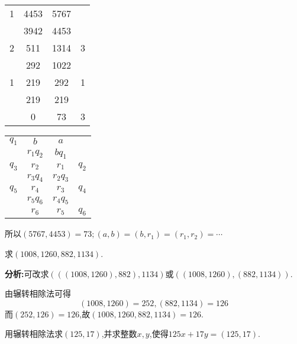 \begin{minipage}{\textwidth}
	\begin{minipage}[t]{0.45\textwidth}
		\centering
		\begin{tabular}{c|cc|c}
			1 & 4453 & 5767 &   \\
			  & 3942 & 4453 &   \\ \cline{2-3}
			2 &  511 & 1314 & 3 \\
			  &  292 & 1022 &   \\ \cline{2-3}
			1 &  219 &  292 & 1 \\
			  &  219 &  219 &   \\ \cline{2-3}
			  &    0 &   73 & 3 \\
		\end{tabular}
	\end{minipage}
	\begin{minipage}[t]{0.45\textwidth}
		\centering
		\begin{tabular}{c|cc|c}
			$q_{1}$ & $b$           & $a$           &         \\
			        & $r_{1} q_{2}$ & $b q_{1}$     &         \\ \cline{2-3}
			$q_{3}$ & $r_{2}$       & $r_{1}$       & $q_{2}$ \\
			        & $r_{3} q_{4}$ & $r_{2} q_{3}$ &         \\ \cline{2-3}
			$q_{5}$ & $r_{4}$       & $r_{3}$       & $q_{4}$ \\
			        & $r_{5} q_{6}$ & $r_{4} q_{5}$ &         \\ \cline{2-3}
			        & $r_{6}$       & $r_{5}$       & $q_{6}$ \\
		\end{tabular}
	\end{minipage}
\end{minipage}

所以$(5767,4453)=73 ;(a, b)=\left(b, r_{1}\right)=\left(r_{1}, r_{2}\right)=\cdots$

\example 求$(1008,1260,882,1134)$.

\textbf{分析:}可改求$(((1008,1260), 882), 1134)$或$((1008,1260),(882,1134))$.

\solve 由辗转相除法可得
\begin{equation*}
	(1008,1260)=252,(882,1134)=126
\end{equation*}
而$(252,126)=126$,故$(1008,1260,882,1134)=126$.

\example 用辗转相除法求$(125,17)$,并求整数$x, y$,使得$125 x+17 y=(125,17)$.

